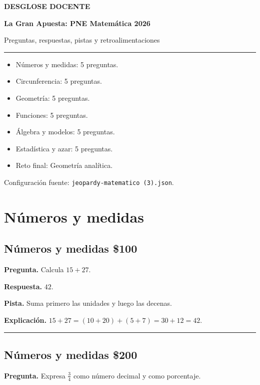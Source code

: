 \documentclass[11pt,letterpaper]{article}
\begin{document}
\begin{titlepage}
\color{DarkInk}
\vspace*{3cm}
{\color{DeepBlue}\bfseries\MakeUppercase{Desglose docente}}\par
\vspace{0.8cm}
{\Huge\bfseries La Gran Apuesta: PNE Matemática 2026}\par
\vspace{0.7cm}
{\Large Preguntas, respuestas, pistas y retroalimentaciones}\par
\vspace{1.5cm}
\rule{\textwidth}{1.5pt}
\vspace{0.7cm}
\begin{itemize}[leftmargin=1.5em]
\item Números y medidas: 5 preguntas.
\item Circunferencia: 5 preguntas.
\item Geometría: 5 preguntas.
\item Funciones: 5 preguntas.
\item Álgebra y modelos: 5 preguntas.
\item Estadística y azar: 5 preguntas.
\item Reto final: Geometría analítica.
\end{itemize}
\vfill
Configuración fuente: \texttt{jeopardy-matematico (3).json}.
\end{titlepage}

\tableofcontents

\clearpage
\section*{Números y medidas}

\subsection*{\textcolor{DeepBlue}{Números y medidas} \hfill \$100}
\textbf{Pregunta.} Calcula $15+27$.


\textbf{Respuesta.} $42$.

\textbf{Pista.} Suma primero las unidades y luego las decenas.

\textbf{Explicación.} $15+27=(10+20)+(5+7)=30+12=42$.


\vspace{0.8em}
\hrule
\vspace{1.1em}


\subsection*{\textcolor{DeepBlue}{Números y medidas} \hfill \$200}
\textbf{Pregunta.} Expresa $\frac{3}{4}$ como número decimal y como porcentaje.
\end{document}

